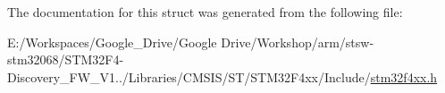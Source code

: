 The documentation for this struct was generated from the following file\-:\begin{DoxyCompactItemize}
\item 
E\-:/\-Workspaces/\-Google\-\_\-\-Drive/\-Google Drive/\-Workshop/arm/stsw-\/stm32068/\-S\-T\-M32\-F4-\/\-Discovery\-\_\-\-F\-W\-\_\-\-V1../\-Libraries/\-C\-M\-S\-I\-S/\-S\-T/\-S\-T\-M32\-F4xx/\-Include/\hyperlink{stm32f4xx_8h}{stm32f4xx.\-h}\end{DoxyCompactItemize}

